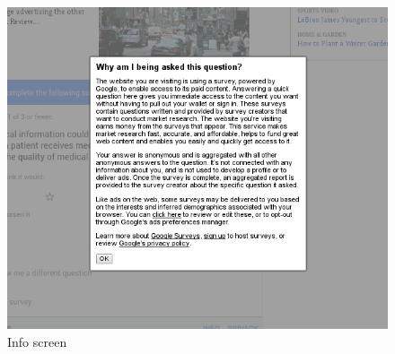\begin{figure}
	\includegraphics{Selection_365.png}
	\caption{\label{fig:info}Info screen}
\end{figure}



